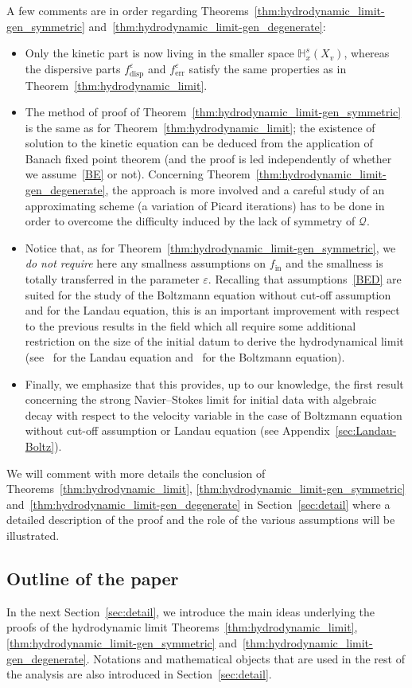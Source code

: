 \documentclass[AHL,Unicode,longabstracts,published]{cedram}
\newcommand{\ini}{\mathrm{in}}
\newcommand{\err}{\mathrm{err}}
\newcommand{\disp}{\mathrm{disp}}
\newcommand{\bbH}{\mathbb{H}}
\newcommand{\QQ}{\mathcal{Q}}
\newcommand{\Sl}{X}
\newcommand*\eps{{\varepsilon}}
\begin{document}
A few comments are in order regarding Theorems~\ref{thm:hydrodynamic_limit-gen_symmetric} and~\ref{thm:hydrodynamic_limit-gen_degenerate}:
\begin{itemize}
\item Only the kinetic part is now living in the smaller space $\bbH^s_x(\Sl_v)$, whereas the dispersive parts $f_\disp^\eps$ and $f^\eps_\err$ satisfy the same properties as in Theorem~\ref{thm:hydrodynamic_limit}.
\item The method of proof of Theorem~\ref{thm:hydrodynamic_limit-gen_symmetric} is the same as for Theorem~\ref{thm:hydrodynamic_limit}; the existence of solution to the kinetic equation can be deduced from the application of Banach fixed point theorem (and the proof is led independently of whether we assume~\eqref{BE} or not). Concerning Theorem~\ref{thm:hydrodynamic_limit-gen_degenerate}, the approach is more involved and a careful study of an approximating scheme (a variation of Picard iterations) has to be done in order to overcome the difficulty induced by the lack of symmetry of $\QQ.$
\item Notice that, as for Theorem~\ref{thm:hydrodynamic_limit-gen_symmetric}, we \emph{do not require} here any smallness assumptions on $f_{\ini}$ and the smallness is totally transferred in the parameter $\eps.$ Recalling that assumptions~\eqref{BED} are suited for the study of the Boltzmann equation without cut-off assumption and for the Landau equation, this is an important improvement with respect to the previous results in the field which all require some additional restriction on the size of the initial datum to derive the hydrodynamical limit (see~\cite{CRT2022} for the Landau equation and~\cite{CC2023} for the Boltzmann equation).
\item Finally, we emphasize that this provides, up to our knowledge, the first result concerning the strong Navier--Stokes limit for initial data with algebraic decay with respect to the velocity variable in the case of Boltzmann equation without cut-off assumption or Landau equation (see Appendix~\ref{sec:Landau-Boltz}).
\end{itemize}
We will comment with more details the conclusion of Theorems~\ref{thm:hydrodynamic_limit}, \ref{thm:hydrodynamic_limit-gen_symmetric} and~\ref{thm:hydrodynamic_limit-gen_degenerate} in Section~\ref{sec:detail} where a detailed description of the proof and the role of the various assumptions will be illustrated.

\subsection{Outline of the paper} 
In the next Section~\ref{sec:detail}, we introduce the main ideas underlying the proofs of {the hydrodynamic limit Theorems}~\ref{thm:hydrodynamic_limit}, \ref{thm:hydrodynamic_limit-gen_symmetric} and~\ref{thm:hydrodynamic_limit-gen_degenerate}. Notations and mathematical objects that are used in the rest of the analysis are also introduced in Section~\ref{sec:detail}.
\end{document}
